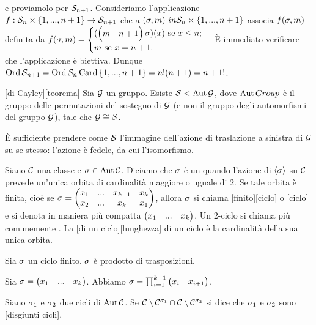 e proviamolo per $\mathcal{S}_{n + 1}$.
Consideriamo l'applicazione
$f: \mathcal{S}_{n} \times \lbrace 1, ..., n + 1 \rbrace \rightarrow
\mathcal{S}_{n + 1}$
che a $(\Permutation,m) \ in \SymmetricGroup{n} \times \lbrace 1, ..., n + 1 \rbrace$
associa $\Map(\Permutation,m)$ definita da
$\Map(\Permutation,m) =
\begin{cases}
(\Cycle{m & n + 1}\Permutation)(x)\text{ se }x \leq n;\\
m\text{ se }x = n + 1.
\end{cases}$
\`E immediato verificare che l'applicazione \`e biettiva.
Dunque $\operatorname{\operatorname{Ord}}{\mathcal{S}_{n + 1}} =
\operatorname{\operatorname{Ord}}{\mathcal{S}_{n}} \operatorname{Card}{\lbrace 1, ..., n + 1 \rbrace} =
n !(n + 1) = n + 1 !$.
\EndProof
\begin{Theorem}
[di Cayley][teorema]
	Sia $\mathcal{G}$ un gruppo. Esiste
	$\mathcal{S} < \operatorname{Aut}{\mathcal{G}}$,
	dove $\operatorname{Aut}{Group}$ \`e il gruppo delle
	permutazioni del sostegno di $\mathcal{G}$ (e non il gruppo
	degli automorfismi del gruppo $\mathcal{G}$),
	tale che $\mathcal{G} \cong \mathcal{S}$.
\end{Theorem}
\Proof
\`E sufficiente prendere come $\mathcal{S}$
l'immagine dell'azione di traslazione a sinistra di
$\mathcal{G}$ su se stesso: l'azione \`e fedele, da cui l'isomorfismo.
\EndProof
\begin{Definition}
	Siano $\mathcal{C}$ una classe e $\Permutation \in \Automorphisms{\Class}$.
	Diciamo che $\Permutation$ \`e un  quando l'azione di
	$\SpanGroup{\Permutation}$ su $\mathcal{C}$ prevede un'unica orbita di
	cardinalit\`a maggiore o uguale di $2$.
	Se tale orbita \`e finita, cio\`e se
	$\Permutation =
	\Permutation[x_1 & ... & x_{k - 1} & x_k][x_2 & ... & x_k & x_1]$,
	allora $\Permutation$ si chiama [finito][ciclo] o
	[ciclo] e si
	denota in maniera pi\`u compatta
	$\left ( \begin{matrix} x_1 & ... & x_k \end{matrix} \right )$.
	Un $2$-ciclo si chiama pi\`u comunemente
	.
	La [di un ciclo][lunghezza] di un ciclo \`e la cardinalit\`a
	della sua unica orbita.
\end{Definition}
\begin{Theorem}
	Sia $\Permutation$ un ciclo finito.
	$\Permutation$ \`e prodotto di trasposizioni.
\end{Theorem}
\Proof
Sia $\Permutation = \Cycle{x_1 & ... & x_k}$.
Abbiamo
$\Permutation = \prod_{i = 1}^{k - 1} \Cycle{x_i & x_{i + 1}}$.
\EndProof
\begin{Definition}
	Siano $\Permutation_1$ e $\Permutation_2$
	due cicli di $\operatorname{Aut}{\mathcal{C}}$.
	Se $\Class \SetMin \Fixed{\Class}{\Permutation_1} \cap
	\Class \SetMin \Fixed{\Class}{\Permutation_2}$ si dice
	che $\Permutation_1$ e $\Permutation_2$ sono
	[disgiunti cicli].
\end{Definition}
